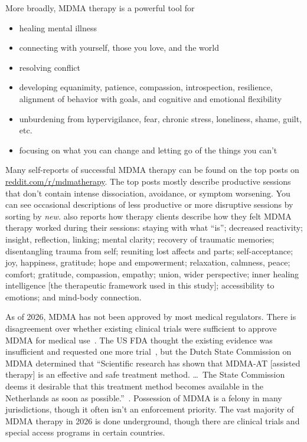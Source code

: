 \documentclass[11pt,oneside]{book}
\let\cite\parencite
\newcommand{\mdcite}[1]{}
\begin{document}
More broadly, MDMA therapy is a powerful tool for
\begin{itemize}
    \item healing mental illness
    \item connecting with yourself, those you love, and the world
    \item resolving conflict
    \item developing equanimity, patience, compassion, introspection, resilience, alignment of behavior with goals, and cognitive and emotional flexibility
    \item unburdening from hypervigilance, fear, chronic stress, loneliness, shame, guilt, etc.
    \item focusing on what you can change and letting go of the things you can't
\end{itemize}

Many self-reports of successful MDMA therapy can be found on the top posts on \href{https://reddit.com/r/mdmatherapy/top/?sort=top&t=all}{reddit.com/r/mdmatherapy}. The top posts mostly describe productive sessions that don't contain intense dissociation, avoidance, or symptom worsening. You can see occasional descriptions of less productive or more disruptive sessions by sorting by \textit{new.} \textcite{godes2023perceived} also reports how therapy clients describe how they felt MDMA therapy worked during their sessions: staying with what \enquote{is}; decreased reactivity; insight, reflection, linking; mental clarity; recovery of traumatic memories; disentangling trauma from self; reuniting lost affects and parts; self-acceptance; joy, happiness, gratitude; hope and empowerment; relaxation, calmness, peace; comfort; gratitude, compassion, empathy; union, wider perspective; inner healing intelligence [the therapeutic framework used in this study]; accessibility to emotions; and mind-body connection.

As of 2026, MDMA has not been approved by most medical regulators. There is disagreement over whether existing clinical trials were sufficient to approve MDMA for medical use~\mdcite{fdaVSdutch}. The US FDA thought the existing evidence was insufficient and requested one more trial~\mdcite{crlAlpha}, but the Dutch State Commission on MDMA determined that \enquote{Scientific research has shown that MDMA-AT [assisted therapy] is an effective and safe treatment method. \dots\ The State Commission deems it desirable that this treatment method becomes available in the Netherlands as soon as possible.}~\cite[p. 203]{netherlandsMDMA}. Possession of MDMA is a felony in many jurisdictions, though it often isn't an enforcement priority. The vast majority of MDMA therapy in 2026 is done underground, though there are clinical trials and special access programs in certain countries.
\end{document}
